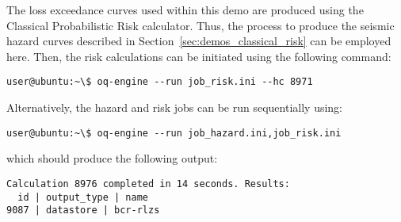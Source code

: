 The loss exceedance curves used within this demo are produced using the
Classical Probabilistic Risk calculator. Thus, the process to produce the
seismic hazard curves described in Section~\ref{sec:demos_classical_risk} can
be employed here. Then, the risk calculations can be initiated using the
following command:

\begin{verbatim}
user@ubuntu:~\$ oq-engine --run job_risk.ini --hc 8971
\end{verbatim}

Alternatively, the hazard and risk jobs can be run sequentially using:

\begin{verbatim}
user@ubuntu:~\$ oq-engine --run job_hazard.ini,job_risk.ini
\end{verbatim}

which should produce the following output:

\begin{verbatim}
Calculation 8976 completed in 14 seconds. Results:
  id | output_type | name
9087 | datastore | bcr-rlzs
\end{verbatim}
